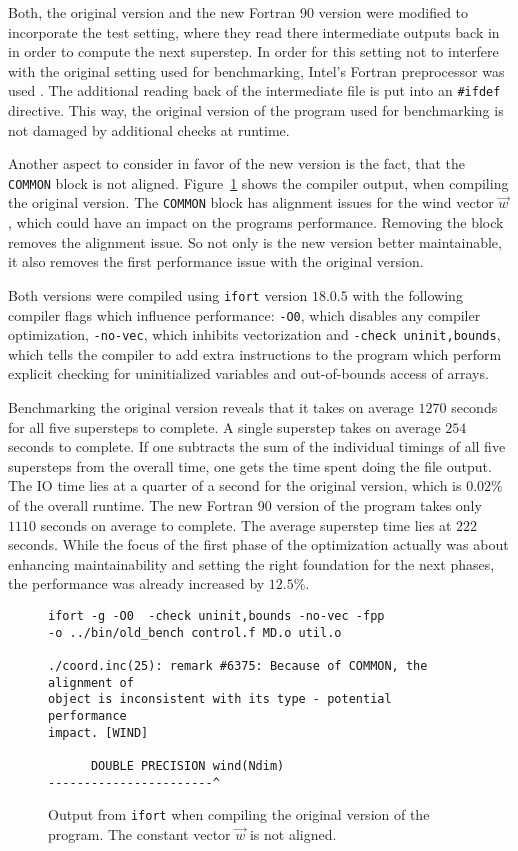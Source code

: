 \documentclass[twoside,11pt]{article}
\begin{document}
Both, the original version and the new Fortran 90 version were
modified to incorporate the test setting, where they read there
intermediate outputs back in in order to compute the next superstep.
In order for this setting not to interfere with the original setting
used for benchmarking, Intel's Fortran preprocessor was used
\citep{fpp}.
The additional reading back of the intermediate file is put into an
\texttt{\#ifdef} directive.
This way, the original version of the program used for benchmarking
is not damaged by additional checks at runtime.

Another aspect to consider in favor of the new version is the fact,
that the \texttt{COMMON} block is not aligned.
Figure~\ref{fig:common_unaligned} shows the compiler output, when
compiling the original version.
The \texttt{COMMON} block has alignment issues for the wind vector
$\vec{w}$, which could have an impact on the programs performance.
Removing the block removes the alignment issue.
So not only is the new version better maintainable, it also removes
the first performance issue with the original version.

Both versions were compiled using \texttt{ifort} version $18.0.5$ with
the following compiler flags which influence performance:
\texttt{-O0}, which disables any compiler optimization,
\texttt{-no-vec}, which inhibits vectorization and
\texttt{-check uninit,bounds}, which tells the compiler to add
extra instructions to the program which perform explicit checking
for uninitialized variables and out-of-bounds access of arrays.

Benchmarking the original version reveals that it takes on average
$1270$ seconds for all five supersteps to complete.
A single superstep takes on average $254$ seconds to complete.
If one subtracts the sum of the individual timings of all five
supersteps from the overall time, one gets the time spent doing the
file output.
The IO time lies at a quarter of a second for the original version,
which is $0.02\%$ of the overall runtime.
The new Fortran 90 version of the program takes only $1110$ seconds
on average to complete.
The average superstep time lies at $222$ seconds.
While the focus of the first phase of the optimization actually was
about enhancing maintainability and setting the right foundation for
the next phases, the performance was already increased by $12.5\%$.

\begin{figure}
\begin{verbatim}
ifort -g -O0  -check uninit,bounds -no-vec -fpp
-o ../bin/old_bench control.f MD.o util.o

./coord.inc(25): remark #6375: Because of COMMON, the alignment of
object is inconsistent with its type - potential performance
impact. [WIND]

      DOUBLE PRECISION wind(Ndim)
-----------------------^
\end{verbatim}
\caption{Output from \texttt{ifort} when compiling the original
  version of the program. The constant vector $\vec{w}$ is not
  aligned.}
\label{fig:common_unaligned}
\end{figure}
\end{document}
